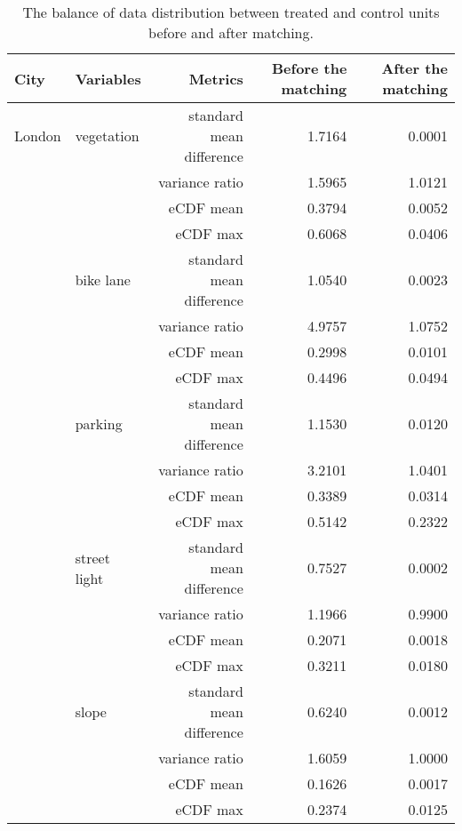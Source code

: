 \begin{table}[!htp]\centering
\caption{The balance of data distribution between treated and control units before and after matching.}\label{result:tab:match_result}
\scriptsize
\begin{tabular}{llrrr}\toprule
City&Variables&Metrics&Before the matching &After the matching \\\midrule

London & vegetation & standard mean difference & 1.7164 & \cellcolor{customgreen} 0.0001 \\
 &  & variance ratio & 1.5965 & \cellcolor{customgreen} 1.0121 \\
 &  & eCDF mean & 0.3794 & \cellcolor{customgreen} 0.0052 \\
 &  & eCDF max & 0.6068 & \cellcolor{customgreen} 0.0406 \\
 & bike lane & standard mean difference & 1.0540 & \cellcolor{customgreen} 0.0023 \\
 &  & variance ratio & 4.9757 & \cellcolor{customgreen} 1.0752 \\
 &  & eCDF mean & 0.2998 & \cellcolor{customgreen} 0.0101 \\
 &  & eCDF max & 0.4496 & \cellcolor{customgreen} 0.0494 \\
 & parking & standard mean difference & 1.1530 & \cellcolor{customgreen} 0.0120 \\
 &  & variance ratio & 3.2101 & \cellcolor{customgreen} 1.0401 \\
 &  & eCDF mean & 0.3389 & \cellcolor{customgreen} 0.0314 \\
 &  & eCDF max & 0.5142 & \cellcolor{customgreen} 0.2322 \\
 & street light & standard mean difference & 0.7527 & \cellcolor{customgreen} 0.0002 \\
 &  & variance ratio & 1.1966 & \cellcolor{customgreen} 0.9900 \\
 &  & eCDF mean & 0.2071 & \cellcolor{customgreen} 0.0018 \\
 &  & eCDF max & 0.3211 & \cellcolor{customgreen} 0.0180 \\
 & slope & standard mean difference & 0.6240 & \cellcolor{customgreen} 0.0012 \\
 &  & variance ratio & 1.6059 & \cellcolor{customgreen} 1.0000 \\
 &  & eCDF mean & 0.1626 & \cellcolor{customgreen} 0.0017 \\
 &  & eCDF max & 0.2374 & \cellcolor{customgreen} 0.0125 \\
\bottomrule
\end{tabular}
\end{table}

